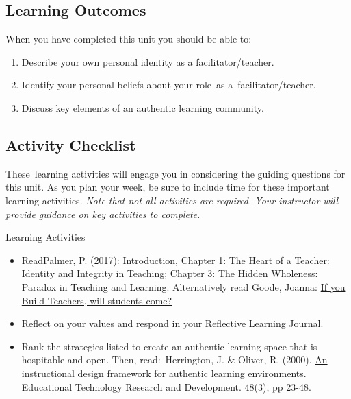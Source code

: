 \documentclass[
]{book}
\providecommand{\tightlist}{%
  \setlength{\itemsep}{0pt}\setlength{\parskip}{0pt}}
\begin{document}
\hypertarget{learning-outcomes}{%
\subsection*{Learning Outcomes}\label{learning-outcomes}}

When you have completed this unit you should be able to:

\begin{enumerate}
\def\labelenumi{\arabic{enumi}.}
\tightlist
\item
  Describe your own personal identity as a facilitator/teacher.\\
\item
  Identify your personal beliefs about your role~as a~facilitator/teacher.\\
\item
  Discuss key elements of an authentic learning community.
\end{enumerate}

\hypertarget{activity-checklist}{%
\subsection*{Activity Checklist}\label{activity-checklist}}

These~learning activities will engage you in considering the guiding questions for this unit. As you plan your week, be sure to include time for these important learning activities. \emph{Note that not all activities are required. Your instructor will provide guidance on key activities to complete.}

\begin{reflect}
{Learning Activities}

\begin{itemize}
\tightlist
\item
  ReadPalmer, P. (2017): Introduction, Chapter 1: The Heart of a Teacher: Identity and Integrity in Teaching; Chapter 3: The Hidden Wholeness: Paradox in Teaching and Learning. Alternatively read Goode, Joanna: \href{https://journals-sagepub-com.twu.idm.oclc.org/doi/pdf/10.2190/2102-5G77-QL77-5506}{If you Build Teachers, will students come?}\\
\item
  Reflect on your values and respond in your Reflective Learning Journal.\\
\item
  Rank the strategies listed to create an authentic learning space that is hospitable and open. Then, read:~Herrington, J. \& Oliver, R. (2000). \href{https://ro.uow.edu.au/edupapers/31/}{An instructional design framework for authentic learning environments.} Educational Technology Research and Development. 48(3), pp 23-48.
\end{itemize}
\end{reflect}
\end{document}
